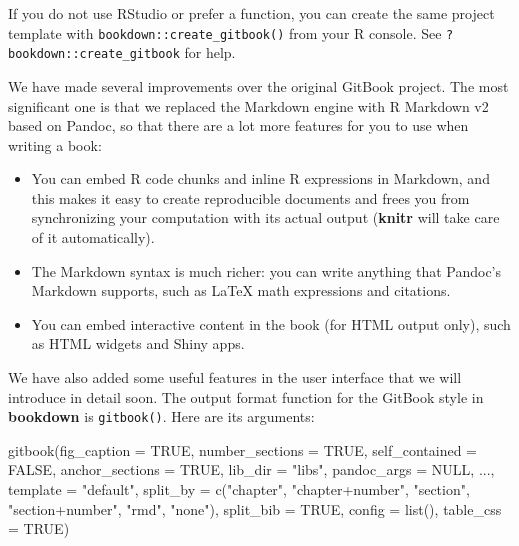 \documentclass[
  12pt,
]{krantz}
\newenvironment{Shaded}{\begin{snugshade}}{\end{snugshade}}
\newcommand{\AttributeTok}[1]{\textcolor[rgb]{0.77,0.63,0.00}{#1}}
\newcommand{\ConstantTok}[1]{\textcolor[rgb]{0.00,0.00,0.00}{#1}}
\newcommand{\FunctionTok}[1]{\textcolor[rgb]{0.00,0.00,0.00}{#1}}
\newcommand{\NormalTok}[1]{#1}
\newcommand{\StringTok}[1]{\textcolor[rgb]{0.31,0.60,0.02}{#1}}
\providecommand{\tightlist}{%
  \setlength{\itemsep}{0pt}\setlength{\parskip}{0pt}}
\theoremstyle{definition}
\theoremstyle{definition}
\theoremstyle{definition}
\theoremstyle{definition}
\theoremstyle{remark}
\begin{document}
If you do not use RStudio or prefer a function, you can create the same project template with \texttt{bookdown::create\_gitbook()} from your R console. See \texttt{?bookdown::create\_gitbook} for help.

We have made several improvements over the original GitBook project. The most significant one is that we replaced the Markdown engine with R Markdown v2 based on Pandoc, so that there are a lot more features for you to use when writing a book:

\begin{itemize}
\tightlist
\item
  You can embed R code chunks and inline R expressions in Markdown, and this makes it easy to create reproducible documents and frees you from synchronizing your computation with its actual output (\textbf{knitr} will take care of it automatically).
\item
  The Markdown syntax is much richer: you can write anything that Pandoc's Markdown supports, such as LaTeX math expressions and citations.
\item
  You can embed interactive content in the book (for HTML output only), such as HTML widgets and Shiny apps.
\end{itemize}

We have also added some useful features in the user interface that we will introduce in detail soon. The output format function for the GitBook style in \textbf{bookdown} is \texttt{gitbook()}. Here are its arguments:

\begin{Shaded}
\begin{Highlighting}[]
\FunctionTok{gitbook}\NormalTok{(}\AttributeTok{fig\_caption =} \ConstantTok{TRUE}\NormalTok{, }\AttributeTok{number\_sections =} \ConstantTok{TRUE}\NormalTok{,}
  \AttributeTok{self\_contained =} \ConstantTok{FALSE}\NormalTok{, }\AttributeTok{anchor\_sections =} \ConstantTok{TRUE}\NormalTok{,}
  \AttributeTok{lib\_dir =} \StringTok{"libs"}\NormalTok{, }\AttributeTok{pandoc\_args =} \ConstantTok{NULL}\NormalTok{, ...,}
  \AttributeTok{template =} \StringTok{"default"}\NormalTok{,}
  \AttributeTok{split\_by =} \FunctionTok{c}\NormalTok{(}\StringTok{"chapter"}\NormalTok{, }\StringTok{"chapter+number"}\NormalTok{, }\StringTok{"section"}\NormalTok{, }\StringTok{"section+number"}\NormalTok{, }\StringTok{"rmd"}\NormalTok{, }\StringTok{"none"}\NormalTok{),}
  \AttributeTok{split\_bib =} \ConstantTok{TRUE}\NormalTok{, }\AttributeTok{config =} \FunctionTok{list}\NormalTok{(), }\AttributeTok{table\_css =} \ConstantTok{TRUE}\NormalTok{)}
\end{Highlighting}
\end{Shaded}
\end{document}
